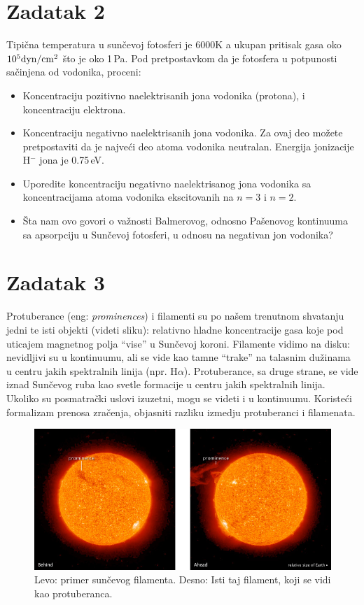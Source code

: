 \documentclass[12pt]{article}
\begin{document}
\section*{Zadatak 2}

Tipi\v{c}na temperatura u sun\v{c}evoj fotosferi je 6000K a ukupan pritisak gasa oko $10^5 {\rm dyn/cm^2}$ \v{s}to je oko 1\,Pa. Pod pretpostavkom da je fotosfera u potpunosti sa\v{c}injena od vodonika, proceni:
\begin{itemize}
    \item Koncentraciju pozitivno naelektrisanih jona vodonika (protona), i koncentraciju elektrona.
    \item Koncentraciju negativno naelektrisanih jona vodonika. Za ovaj deo mo\v{z}ete pretpostaviti da je najve\'{c}i deo atoma vodonika neutralan. Energija jonizacije H$^-$ jona je 0.75\,eV.
    \item Uporedite koncentraciju negativno naelektrisanog jona vodonika sa koncentracijama atoma vodonika ekscitovanih na $n=3$ i $n=2$.
    \item \v{S}ta nam ovo govori o va\v{z}nosti Balmerovog, odnosno Pa\v{s}enovog kontinuuma sa apsorpciju u Sun\v{c}evoj fotosferi, u odnosu na negativan jon vodonika?
\end{itemize}

\section*{Zadatak 3}

Protuberance (eng: \emph{prominences}) i filamenti su po na\v{s}em trenutnom shvatanju jedni te isti objekti (videti sliku): relativno hladne koncentracije gasa koje pod uticajem magnetnog polja ``vise'' u Sun\v{c}evoj koroni. Filamente vidimo na disku: nevidljivi su u kontinuumu, ali se vide kao tamne ``trake'' na talasnim du\v{z}inama u centru jakih spektralnih linija (npr. H$\alpha$). Protuberance, sa druge strane, se vide iznad Sun\v{c}evog ruba kao svetle formacije u centru jakih spektralnih linija. Ukoliko su posmatra\v{c}ki uslovi izuzetni, mogu se videti i u kontinuumu. Koriste\'{c}i formalizam prenosa zra\v{c}enja, objasniti razliku izmedju protuberanci i filamenata.

\begin{figure}
\includegraphics[width=\textwidth]{prominence.jpg}
\caption{Levo: primer sun\v{c}evog filamenta. Desno: Isti taj filament, koji se vidi kao protuberanca.}
\end{figure}
\end{document}
